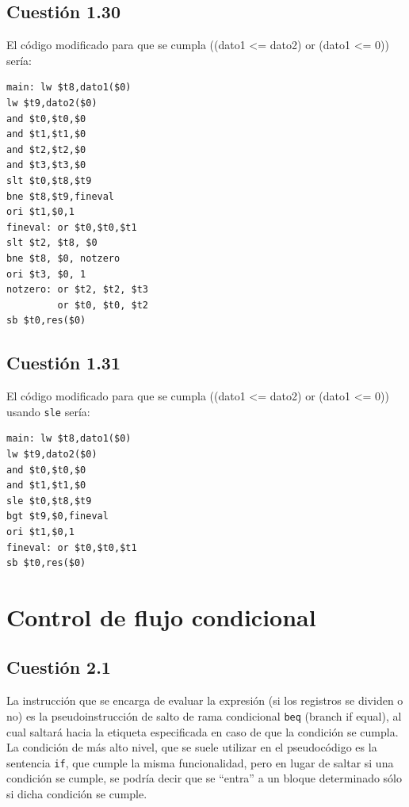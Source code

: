 \documentclass[11pt]{article}
\begin{document}
\begin{large}
\begin{flushleft}
\subsection*{Cuestión 1.30}
El código modificado para que se cumpla ((dato1 <= dato2) or (dato1 <= 0)) sería:
\begin{listing}[h]
\begin{verbatim}
main: lw $t8,dato1($0)
lw $t9,dato2($0)
and $t0,$t0,$0
and $t1,$t1,$0
and $t2,$t2,$0
and $t3,$t3,$0
slt $t0,$t8,$t9
bne $t8,$t9,fineval
ori $t1,$0,1
fineval: or $t0,$t0,$t1
slt $t2, $t8, $0
bne $t8, $0, notzero
ori $t3, $0, 1
notzero: or $t2, $t2, $t3 
         or $t0, $t0, $t2
sb $t0,res($0)

\end{verbatim}
\end{listing}

\subsection*{Cuestión 1.31}
El código modificado para que se cumpla ((dato1 <= dato2) or (dato1 <= 0)) usando \texttt{sle} sería:

\begin{listing}[h]
\begin{verbatim}
main: lw $t8,dato1($0)
lw $t9,dato2($0)
and $t0,$t0,$0
and $t1,$t1,$0
sle $t0,$t8,$t9
bgt $t9,$0,fineval
ori $t1,$0,1
fineval: or $t0,$t0,$t1
sb $t0,res($0)

\end{verbatim}
\end{listing}

\section*{Control de flujo condicional}

\subsection*{Cuestión 2.1} 
La instrucción que se encarga de evaluar la expresión (si los registros se dividen o no) es la pseudoinstrucción de salto de rama condicional \texttt{beq} (branch if equal), al cual saltará hacia la etiqueta especificada en caso de que la condición se cumpla. La condición de más alto nivel, que se suele utilizar en el pseudocódigo es la sentencia \texttt{if}, que cumple la misma funcionalidad, pero en lugar de saltar si una condición se cumple, se podría decir que se ``entra'' a un bloque determinado sólo si dicha condición se cumple.




\end{flushleft}
\end{large}
\end{document}

